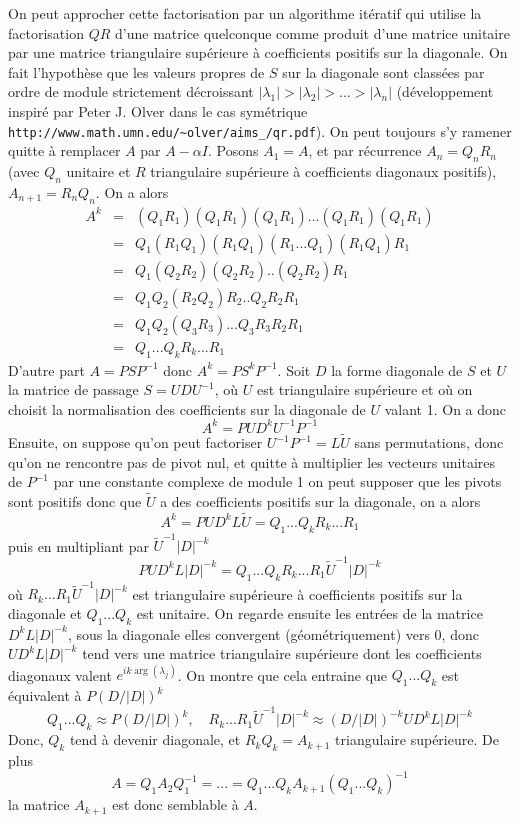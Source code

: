 \documentclass[a4paper,11pt]{article}
\begin{document}
On peut approcher cette factorisation par un algorithme it\'eratif
qui utilise la factorisation $QR$ d'une matrice quelconque comme
produit d'une matrice unitaire par une matrice triangulaire sup\'erieure
\`a coefficients positifs sur la diagonale. On fait l'hypoth\`ese que les
valeurs propres de $S$ sur la diagonale sont class\'ees par ordre de module 
strictement d\'ecroissant $|\lambda_1|>|\lambda_2|>...>|\lambda_n|$ 
(d\'eveloppement inspir\'e par Peter J. Olver dans le cas sym\'etrique
\verb|http://www.math.umn.edu/~olver/aims_/qr.pdf|). On peut toujours
s'y ramener quitte à remplacer $A$ par $A- \alpha I$.
Posons $A_1=A$, et par r\'ecurrence $A_n=Q_nR_n$ (avec $Q_n$ unitaire et $R$
triangulaire sup\'erieure à coefficients diagonaux positifs), 
$A_{n+1}=R_nQ_n$. On a alors
\begin{eqnarray*}
 A^k  
& = & (Q_1 R_1) (Q_1 R_1) (Q_1 R_1) ... (Q_1 R_1) (Q_1 R_1) \\
& = & Q_1 (R_1 Q_1) (R_1 Q_1) (R_1 ... Q_1) (R_1 Q_1) R_1 \\
& = & Q_1 (Q_2 R_2) (Q_2 R_2) .. (Q_2 R_2) R_1 \\
& = & Q_1 Q_2 (R_2 Q_2) R_2 .. Q_2 R_2 R_1 \\
& = & Q_1 Q_2 (Q_3 R_3) ... Q_3 R_3 R_2 R_1 \\
& = & Q_1 ... Q_k R_k ...R_1
\end{eqnarray*}
D'autre part $A=PSP^{-1}$ donc $A^k = P S^k P^{-1}$. Soit $D$ la forme diagonale
de $S$ et $U$ la matrice de passage $S=UDU^{-1}$, où $U$ est triangulaire supérieure
et où on choisit la normalisation des coefficients sur la diagonale de $U$ valant 1.
On a donc 
\[ A^k = P U D^{k} U^{-1} P^{-1} \]
Ensuite, on suppose
qu'on peut factoriser $U^{-1}P^{-1}=L\tilde{U}$ sans permutations, donc
qu'on ne rencontre pas de pivot nul, et quitte \`a multiplier 
les vecteurs unitaires de $P^{-1}$ par une constante complexe de module 1
on peut supposer que les pivots sont positifs donc que $\tilde{U}$ a
des coefficients positifs sur la diagonale, on a alors
\[ A^k = P U D^k L \tilde{U} = Q_1 ... Q_k R_k ...R_1 \]
puis en multipliant par $\tilde{U}^{-1} |D|^{-k}$
\[ P U D^k L |D|^{-k} =  Q_1 ... Q_k R_k ...R_1 \tilde{U}^{-1} |D|^{-k} \]
o\`u $R_k ...R_1 \tilde{U}^{-1} |D|^{-k}$ est triangulaire sup\'erieure à coefficients positifs
sur la diagonale et $Q_1 ... Q_k$ est unitaire. On regarde ensuite les entr\'ees 
de la matrice $D^k L |D|^{-k}$, sous la diagonale elles convergent (géométriquement) vers 0,
donc $UD^k L |D|^{-k}$ tend vers une matrice triangulaire sup\'erieure
dont les coefficients diagonaux valent $e^{i k\arg(\lambda_j)}$. On montre que cela
entraine que $Q_1 ... Q_k $ est équivalent à $P(D/|D|)^k$
\[ Q_1 ... Q_k \approx P (D/|D|)^{k}, \quad  
R_k ...R_1 \tilde{U}^{-1} |D|^{-k} \approx (D/|D|)^{-k} UD^k L |D|^{-k} \]
Donc, $Q_k$ tend à devenir diagonale, et $R_k Q_k=A_{k+1}$ triangulaire supérieure. De plus
\[ A=Q_1 A_2 Q_1^{-1} = ... = Q_1 ... Q_k A_{k+1} (Q_1 ... Q_k)^{-1} \]
la matrice $A_{k+1}$ est donc semblable à $A$.
\end{document}
